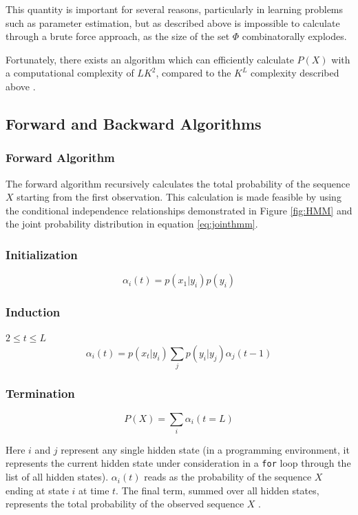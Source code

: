 This quantity is important for several reasons, particularly in learning problems such as parameter estimation, but as described above is impossible to calculate through a brute force approach, as the size of the set $\Phi$ combinatorally explodes.

Fortunately, there exists an algorithm which can efficiently calculate $P(X)$ with a computational complexity of $LK^2$, compared to the $K^L$ complexity described above \cite{Rabiner1989ARecognition}.
\subsection{Forward and Backward Algorithms}
\subsubsection{Forward Algorithm}
The forward algorithm recursively calculates the total probability of the sequence $X$ starting from the first observation. This calculation is made feasible by using the conditional independence relationships demonstrated in Figure \ref{fig:HMM} and the joint probability distribution in equation \ref{eq:jointhmm}.

\subsubsection{Initialization}
\begin{equation}
    \alpha_i(t) = p(x_1|y_i)p(y_i)
\label{eq:fwdinit}
\end{equation}

\subsubsection{Induction}
$2\leq t\leq L$
\begin{equation}
    \alpha_i(t) =p(x_t|y_i)\sum_{j}{p(y_i|y_j)\alpha_j(t-1)}
\label{eq:fwdinduc}
\end{equation}

\subsubsection{Termination}
\begin{equation}
    P(X)= \sum_i{\alpha_i(t=L)}
\label{eq:fwdterm}
\end{equation}

Here $i$ and $j$ represent any single hidden state (in a programming environment, it represents the current hidden state under consideration in a \texttt{for} loop through the list of all hidden states). $\alpha_i(t)$ reads as the probability of the sequence $X$ ending at state $i$ at time $t$. The final term, summed over all hidden states, represents the total probability of the observed sequence $X$ \cite{Rabiner1989ARecognition}.

